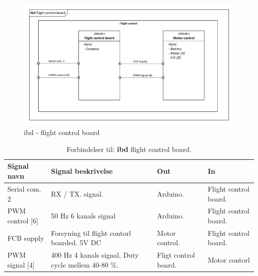 

\begin{figure}[H]
\centering
\includegraphics[width=1\textwidth]{Billeder/IBD/ibd5_flightcontrolboard.pdf}
\caption{ibd - flight control board}
\label{fig:ibd_flightcontrolboard}
\end{figure}

\begin{table}[H]
	\centering
		\begin{tabular}{|p{2.5 cm}|p{5.5 cm}|p{2.5 cm}|p{2.5 cm}|} 
		\hline
			\textbf{Signal navn} 	& \textbf{Signal beskrivelse}		& \textbf{Out} 				& \textbf{In}     \\ \hline
			Serial com. 2 & RX / TX. signal. & Arduino. & Flight control board.			    \\ \hline
			PWM control [6] & 50 Hz 6 kanals signal & Arduino. & Flight control board.				\\ \hline
			FCB supply &  Forsyning til flight contorl boarded. 5V DC & Motor control. & Flight control board.	\\ \hline
			PWM signal [4] & 400 Hz 4 kanals signal, Duty cycle mellem 40-80 $\%$. & Fligt control board. & Motor contorl   \\ \hline 
		\end{tabular}
	\caption{Forbindelser til: \textbf{ibd} flight control board. }
	\label{tab:ibd_Flight_control_board}
\end{table}



